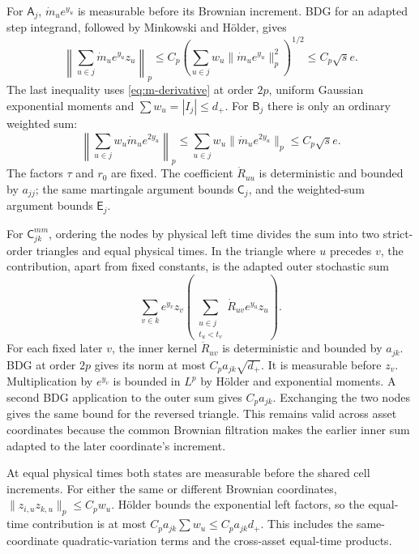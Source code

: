 \documentclass[11pt,a4paper]{amsart}
\theoremstyle{plain}
\theoremstyle{definition}
\theoremstyle{remark}
\begin{document}
For $\mathsf A_j$, $\dot m_u e^{y_u}$ is measurable before its Brownian
increment. BDG for an adapted step integrand, followed by Minkowski and
H\"older, gives
\[
 \left\|\sum_{u\in j}\dot m_u e^{y_u}z_u\right\|_p
 \le C_p\left(\sum_{u\in j}w_u
                     \|\dot m_u e^{y_u}\|_p^2\right)^{1/2}
 \le C_p\sqrt{s}e.
\]
The last inequality uses \eqref{eq:m-derivative} at order $2p$, uniform
Gaussian exponential moments and $\sum w_u=|I_j|\le d_+$.
For $\mathsf B_j$ there is only an ordinary weighted sum:
\[
 \left\|\sum_{u\in j}w_u\dot m_u e^{2y_u}\right\|_p
 \le\sum_{u\in j}w_u\|\dot m_u e^{2y_u}\|_p
 \le C_p\sqrt{s}e.
\]
The factors $\tau$ and $r_0$ are fixed. The coefficient $\dot R_{uu}$ is
deterministic and bounded by $a_{jj}$; the same martingale argument bounds
$\mathsf C_j$, and the weighted-sum argument bounds $\mathsf E_j$.

For $\mathsf C^{mm}_{jk}$, ordering the nodes by physical left time divides
the sum into two strict-order triangles and equal physical times. In the
triangle where $u$ precedes $v$, the contribution, apart from fixed
constants, is the adapted outer stochastic sum
\[
 \sum_{v\in k} e^{y_v}z_v
      \left(\sum_{\substack{u\in j\\t_u<t_v}}
                    \dot R_{uv}e^{y_u}z_u\right).
\]
For each fixed later $v$, the inner kernel $\dot R_{uv}$ is deterministic
and bounded by $a_{jk}$. BDG at order $2p$ gives its norm at most
$C_pa_{jk}\sqrt{d_+}$. It is measurable before $z_v$.
Multiplication by $e^{y_v}$ is bounded in $L^p$ by H\"older and exponential
moments. A second BDG application to the outer sum gives $C_pa_{jk}$.
Exchanging the two nodes gives the same bound for the reversed triangle.
This remains valid across asset coordinates because the common
Brownian filtration makes the earlier inner sum adapted to the later
coordinate's increment.

At equal physical times both states are measurable before the shared cell
increments. For either the same or different Brownian coordinates,
$\|z_{i,u}z_{k,u}\|_p\le C_pw_u$. H\"older bounds the exponential left
factors, so the equal-time contribution is at most
$C_pa_{jk}\sum w_u\le C_pa_{jk}d_+$. This includes the same-coordinate
quadratic-variation terms and the cross-asset equal-time products.
\end{document}
